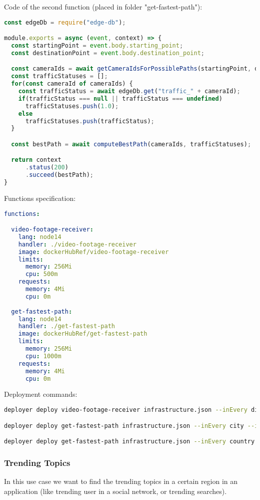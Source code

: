 Code of the second function (placed in folder "get-fastest-path"):
\begin{lstlisting}[language=javascript]
const edgeDb = require("edge-db");

module.exports = async (event, context) => {
  const startingPoint = event.body.starting_point;
  const destinationPoint = event.body.destination_point;

  const cameraIds = await getCameraIdsForPossiblePaths(startingPoint, destinationPoint);
  const trafficStatuses = [];
  for(const cameraId of cameraIds) {
    const trafficStatus = await edgeDb.get("traffic_" + cameraId);
    if(trafficStatus === null || trafficStatus === undefined)
      trafficStatuses.push(1.0);
    else
      trafficStatuses.push(trafficStatus);
  }

  const bestPath = await computeBestPath(cameraIds, trafficStatuses);

  return context
      .status(200)
      .succeed(bestPath);
}
\end{lstlisting}

Functions specification:
\begin{lstlisting}[language=yaml,firstnumber=1]
functions:

  video-footage-receiver:
    lang: node14
    handler: ./video-footage-receiver
    image: dockerHubRef/video-footage-receiver
    limits:
      memory: 256Mi
      cpu: 500m
    requests:
      memory: 4Mi
      cpu: 0m
      
  get-fastest-path:
    lang: node14
    handler: ./get-fastest-path
    image: dockerHubRef/get-fastest-path
    limits:
      memory: 256Mi
      cpu: 1000m
    requests:
      memory: 4Mi
      cpu: 0m
\end{lstlisting}

Deployment commands:
\begin{lstlisting}[language=bash]
deployer deploy video-footage-receiver infrastructure.json --inEvery district --inAreas us

deployer deploy get-fastest-path infrastructure.json --inEvery city --inAreas us

deployer deploy get-fastest-path infrastructure.json --inEvery country --inAreas us
\end{lstlisting}


\subsubsection{Trending Topics}
In this use case we want to find the trending topics in a certain region in an application (like trending user in a social network, or trending searches).

